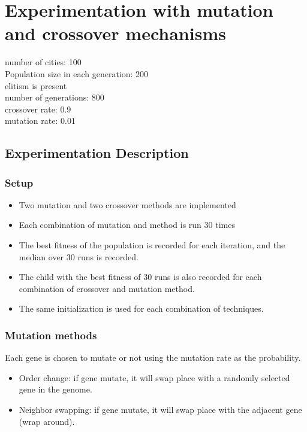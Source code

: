 \documentclass[14pt,a4paper,openright,twoside]{extreport}
\begin{document}
\newpage
\section*{Experimentation with mutation and crossover mechanisms}

number of cities: 100 \\
Population size in each generation: 200  \\
elitism is present \\
number of generations: 800 \\
crossover rate: 0.9 \\
mutation rate: 0.01


\subsection*{Experimentation Description}
\subsubsection*{Setup}
\begin{itemize}
    \item Two mutation and two crossover methods are implemented
    \item Each combination of mutation and method is run 30 times
    \item The best fitness of the population is recorded for each iteration, and the median over 30 runs is recorded.
    \item The child with the best fitness of 30 runs is also recorded for each combination of crossover and mutation method.
    \item The same initialization is used for each combination of techniques.
\end{itemize}

\subsubsection*{Mutation methods}
Each gene is chosen to mutate or not using the mutation rate as the probability.
\begin{itemize}
    \item Order change: if gene mutate, it will swap place with a randomly selected gene in the genome.
    \item Neighbor swapping: if gene mutate, it will swap place with the adjacent gene (wrap around).
\end{itemize}
\end{document}

